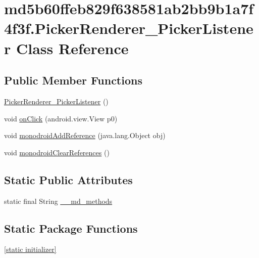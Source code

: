 \hypertarget{classmd5b60ffeb829f638581ab2bb9b1a7f4f3f_1_1_picker_renderer___picker_listener}{
\section{md5b60ffeb829f638581ab2bb9b1a7f4f3f.PickerRenderer\_\-PickerListener Class Reference}
\label{classmd5b60ffeb829f638581ab2bb9b1a7f4f3f_1_1_picker_renderer___picker_listener}
}
\subsection*{Public Member Functions}
\begin{CompactItemize}
\item 
\hyperlink{classmd5b60ffeb829f638581ab2bb9b1a7f4f3f_1_1_picker_renderer___picker_listener_47833692a812ec436b2f7e80c0ece540}{PickerRenderer\_\-PickerListener} ()
\item 
void \hyperlink{classmd5b60ffeb829f638581ab2bb9b1a7f4f3f_1_1_picker_renderer___picker_listener_ef0d59497745728afe6baf752662eb80}{onClick} (android.view.View p0)
\item 
void \hyperlink{classmd5b60ffeb829f638581ab2bb9b1a7f4f3f_1_1_picker_renderer___picker_listener_1ecadd473c72ac34242c9c05a4fbee20}{monodroidAddReference} (java.lang.Object obj)
\item 
void \hyperlink{classmd5b60ffeb829f638581ab2bb9b1a7f4f3f_1_1_picker_renderer___picker_listener_c661d5ab4c8deffbe678f76e609c7e1f}{monodroidClearReferences} ()
\end{CompactItemize}
\subsection*{Static Public Attributes}
\begin{CompactItemize}
\item 
static final String \hyperlink{classmd5b60ffeb829f638581ab2bb9b1a7f4f3f_1_1_picker_renderer___picker_listener_69ae8fbc93864ac38ac6d4c96542e2b5}{\_\-\_\-md\_\-methods}
\end{CompactItemize}
\subsection*{Static Package Functions}
\begin{CompactItemize}
\item 
\hyperlink{classmd5b60ffeb829f638581ab2bb9b1a7f4f3f_1_1_picker_renderer___picker_listener_9ef4eef67f04c07757fc91ee41e2efc6}{\mbox{[}static initializer\mbox{]}}
\end{CompactItemize}
